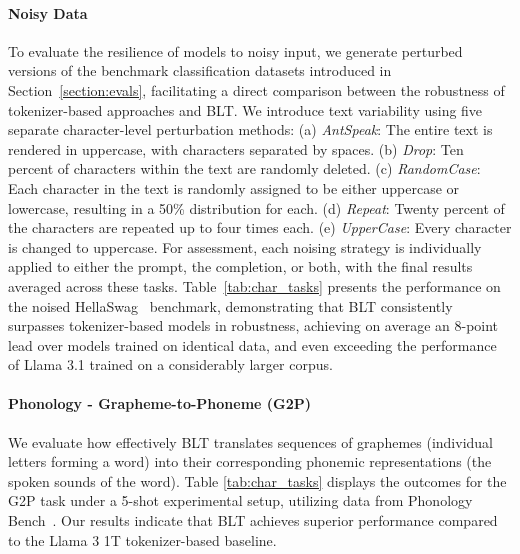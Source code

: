\paragraph{Noisy Data} To evaluate the resilience of models to noisy input, we generate perturbed versions of the benchmark classification datasets introduced in Section~\ref{section:evals}, facilitating a direct comparison between the robustness of tokenizer-based approaches and {\textsc BLT}. We introduce text variability using five separate character-level perturbation methods: (a) \textit{AntSpeak}: The entire text is rendered in uppercase, with characters separated by spaces. (b) \textit{Drop}: Ten percent of characters within the text are randomly deleted. (c) \textit{RandomCase}: Each character in the text is randomly assigned to be either uppercase or lowercase, resulting in a 50\% distribution for each. (d) \textit{Repeat}: Twenty percent of the characters are repeated up to four times each. (e) \textit{UpperCase}: Every character is changed to uppercase. For assessment, each noising strategy is individually applied to either the prompt, the completion, or both, with the final results averaged across these tasks. Table~\ref{tab:char_tasks} presents the performance on the noised HellaSwag~\citep{Eval_hellaswag} benchmark, demonstrating that {\textsc BLT} consistently surpasses tokenizer-based models in robustness, achieving on average an 8-point lead over models trained on identical data, and even exceeding the performance of Llama 3.1 trained on a considerably larger corpus.

\paragraph{Phonology - Grapheme-to-Phoneme (G2P)} We evaluate how effectively {\textsc BLT} translates sequences of graphemes (individual letters forming a word) into their corresponding phonemic representations (the spoken sounds of the word). Table \ref{tab:char_tasks} displays the outcomes for the G2P task under a 5-shot experimental setup, utilizing data from Phonology Bench~\citep{suvarna2024phonologybench}. Our results indicate that {\textsc BLT} achieves superior performance compared to the Llama 3 1T tokenizer-based baseline.


